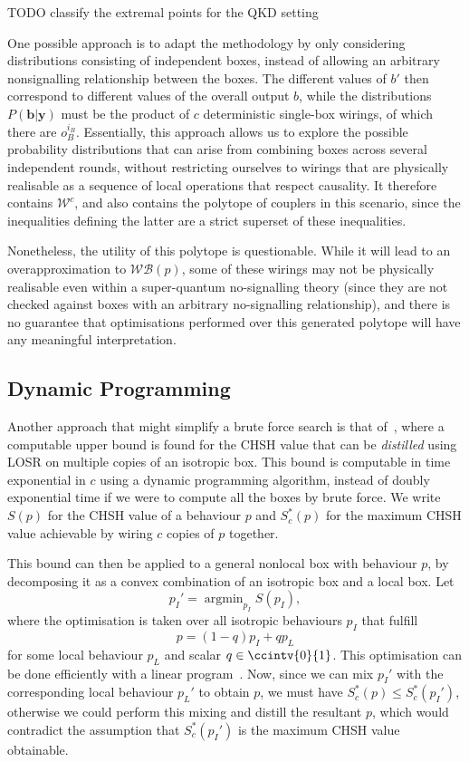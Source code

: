 \documentclass[10pt, a4paper]{article}
\numberwithin{equation}{section} %
\theoremstyle{definition}
\theoremstyle{plain}
\DeclareMathOperator*{\argmin}{argmin}
\newcommand{\?}{\mathrel{?}} %
\newcommand{\cvec}[1]{\boldsymbol{\mathbf{#1}}}    %
\newcommand{\sW}{\mathcal{W}}
\newcommand{\sWB}{\mathcal{WB}}
\begin{document}
      TODO classify the extremal points for the QKD setting

      One possible approach is to adapt the methodology by only considering distributions consisting of independent boxes, instead of allowing an arbitrary nonsignalling relationship between the boxes. The different values of \(b'\) then correspond to different values of the overall output \(b\), while the distributions \(P(\cvec{b}|\cvec{y})\) must be the product of \(c\) deterministic single-box wirings, of which there are \(o_B^{i_B}\). Essentially, this approach allows us to explore the possible probability distributions that can arise from combining boxes across several independent rounds, without restricting ourselves to wirings that are physically realisable as a sequence of local operations that respect causality. It therefore contains \(\sW^c\), and also contains the polytope of couplers in this scenario, since the inequalities defining the latter are a strict superset of these inequalities.

      Nonetheless, the utility of this polytope is questionable. While it will lead to an overapproximation to \(\sWB(p)\), some of these wirings may not be physically realisable even within a super-quantum no-signalling theory (since they are not checked against boxes with an arbitrary no-signalling relationship), and there is no guarantee that optimisations performed over this generated polytope will have any meaningful interpretation.

      \subsection{Dynamic Programming}

      Another approach that might simplify a brute force search is that of~\cite{DistillationBounds}, where a computable upper bound is found for the CHSH value that can be \emph{distilled} using LOSR on multiple copies of an isotropic box. This bound is computable in time exponential in \(c\) using a dynamic programming algorithm, instead of doubly exponential time if we were to compute all the boxes by brute force. We write \(S(p)\) for the CHSH value of a behaviour \(p\) and \(S^*_c(p)\) for the maximum CHSH value achievable by wiring \(c\) copies of \(p\) together.

      This bound can then be applied to a general nonlocal box with behaviour \(p\), by decomposing it as a convex combination of an isotropic box and a local box. Let
      \[ p_I' = \argmin_{p_I} S(p_I), \]
      where the optimisation is taken over all isotropic behaviours \(p_I\) that fulfill
      \[ p = (1-q)p_I + qp_L \]
      for some local behaviour \(p_L\) and scalar \(q \in\ccintv{0}{1}\). This optimisation can be done efficiently with a linear program~\cite{LocalPartLP}. Now, since we can mix \(p_I'\) with the corresponding local behaviour \(p_L'\) to obtain \(p\), we must have \(S^*_c(p) \leq S^*_c(p_I')\), otherwise we could perform this mixing and distill the resultant \(p\), which would contradict the assumption that \(S^*_c(p_I')\) is the maximum CHSH value obtainable.
\end{document}
